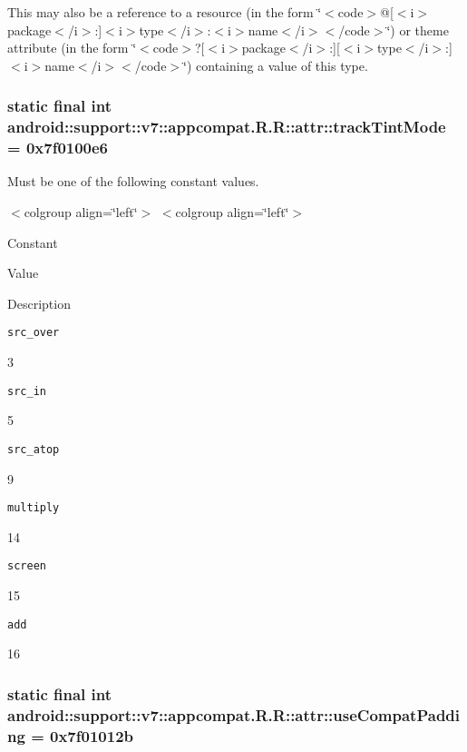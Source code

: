 This may also be a reference to a resource (in the form \char`\"{}$<$code$>$@\mbox{[}$<$i$>$package$<$/i$>$:\mbox{]}$<$i$>$type$<$/i$>$:$<$i$>$name$<$/i$>$$<$/code$>$\char`\"{}) or theme attribute (in the form \char`\"{}$<$code$>$?\mbox{[}$<$i$>$package$<$/i$>$:\mbox{]}\mbox{[}$<$i$>$type$<$/i$>$:\mbox{]}$<$i$>$name$<$/i$>$$<$/code$>$\char`\"{}) containing a value of this type. \hypertarget{classandroid_1_1support_1_1v7_1_1appcompat_1_1_r_1_1attr_31919f6aca37687800f23033ff6ebc51}{
\subsubsection[{trackTintMode}]{\setlength{\rightskip}{0pt plus 5cm}static final int android::support::v7::appcompat.R.R::attr::trackTintMode = 0x7f0100e6}}
\label{classandroid_1_1support_1_1v7_1_1appcompat_1_1_r_1_1attr_31919f6aca37687800f23033ff6ebc51}


Must be one of the following constant values. \begin{TabularC}{0}
\hline
\end{TabularC}
$<$colgroup align=\char`\"{}left\char`\"{}$>$ $<$colgroup align=\char`\"{}left\char`\"{}$>$ 

Constant

Value

Description 

{\tt src\_\-over}

3

{\tt src\_\-in}

5

{\tt src\_\-atop}

9

{\tt multiply}

14

{\tt screen}

15

{\tt add}

16\hypertarget{classandroid_1_1support_1_1v7_1_1appcompat_1_1_r_1_1attr_8ab9cb4866374a553554660cceb961f6}{
\subsubsection[{useCompatPadding}]{\setlength{\rightskip}{0pt plus 5cm}static final int android::support::v7::appcompat.R.R::attr::useCompatPadding = 0x7f01012b}}
\label{classandroid_1_1support_1_1v7_1_1appcompat_1_1_r_1_1attr_8ab9cb4866374a553554660cceb961f6}


